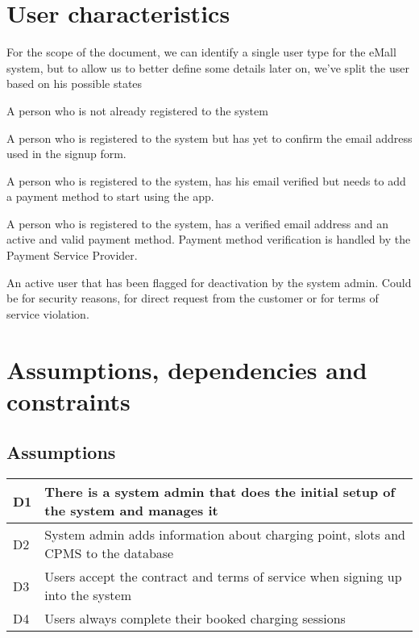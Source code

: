 \section{User characteristics}
For the scope of the document, we can identify a single user type for the eMall system, but to allow us to better define some details later on, we've split the user based on his possible states

\begin{enumerate}
	A person who is not already registered to the system
	
	A person who is registered to the system but has yet to confirm the email address used in the signup form.
	
	A person who is registered to the system, has his email verified but needs to add a payment method to start using the app.

	A person who is registered to the system, has a verified email address and an active and valid payment method. Payment method verification is handled by the Payment Service Provider.
	
	An active user that has been flagged for deactivation by the system admin. Could be for security reasons, for direct request from the customer or for terms of service violation.

\end{enumerate}

\section{Assumptions, dependencies and constraints}

\subsection{Assumptions}
\begin{tabular}{|l|l|}
	\hline
	D1 & There is a system admin that does the initial setup of the system and manages it\\
	\hline
	D2 & System admin adds information about charging point, slots and CPMS to the database\\
	\hline
	D3 & Users accept the contract and terms of service when signing up into the system\\
	\hline
	D4 & Users always complete their booked charging sessions\\
	\hline
\end{tabular}





















